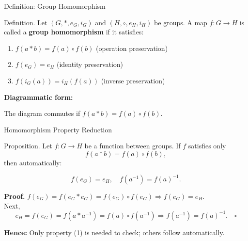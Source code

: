 \documentclass[11pt,aspectratio=43,ignorenonframetext,t]{beamer}
\begin{document}
\begin{frame}{Definition: Group Homomorphism}
\vspace{-0.3cm}
\begin{block}{Definition.}  
Let $(G, *, e_G, i_G)$ and $(H, \circ, e_H, i_H)$ be groups.  
A map \( f:G \to H \) is called a \textbf{group homomorphism} if it satisfies:

\begin{enumerate}
    \item \( f(a*b) = f(a) \circ f(b) \) \hfill (operation preservation)
    \item \( f(e_G) = e_H \) \hfill (identity preservation)
    \item \( f(i_G(a)) = i_H(f(a)) \) \hfill (inverse preservation)
\end{enumerate}
\end{block}{}

\textbf{Diagrammatic form:}
\centering
{}
The diagram commutes if \(f(a*b)=f(a)\circ f(b)\).
\end{frame}

\begin{frame}{Homomorphism Property Reduction}
\vspace{-0.3cm}
\begin{block}{Proposition.}  
Let \(f:G\to H\) be a function between groups.  
If \(f\) satisfies only
\[
f(a*b)=f(a)\circ f(b),
\]
then automatically:

\[
f(e_G)=e_H, \quad f(a^{-1})=f(a)^{-1}.
\]

\textbf{Proof.} $f(e_G) = f(e_G * e_G) = f(e_G)\circ f(e_G)
\Rightarrow f(e_G) = e_H.$ \\
Next, \[e_H = f(e_G) = f(a*a^{-1}) = f(a)\circ f(a^{-1}) \Rightarrow f(a^{-1}) = f(a)^{-1}. \quad\square
\]

\textbf{Hence:} Only property (1) is needed to check; others follow automatically.
\end{block}
\end{frame}
\end{document}
